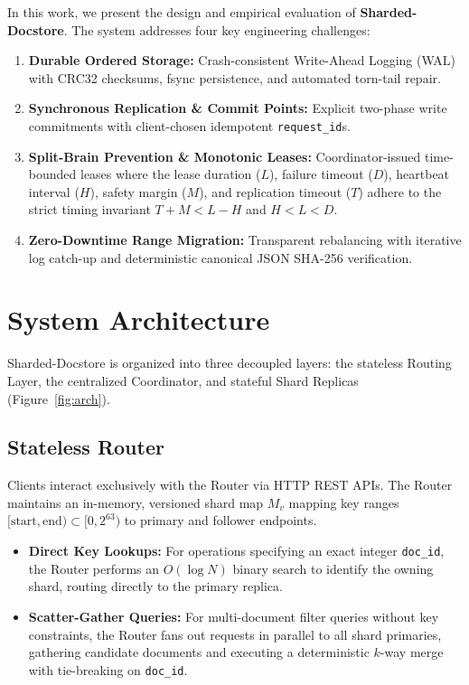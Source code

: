 \documentclass[10pt,journal,compsoc]{IEEEtran}
\begin{document}
In this work, we present the design and empirical evaluation of \textbf{Sharded-Docstore}. The system addresses four key engineering challenges:
\begin{enumerate}
    \item \textbf{Durable Ordered Storage:} Crash-consistent Write-Ahead Logging (WAL) with CRC32 checksums, fsync persistence, and automated torn-tail repair.
    \item \textbf{Synchronous Replication \& Commit Points:} Explicit two-phase write commitments with client-chosen idempotent \texttt{request\_id}s.
    \item \textbf{Split-Brain Prevention \& Monotonic Leases:} Coordinator-issued time-bounded leases where the lease duration ($L$), failure timeout ($D$), heartbeat interval ($H$), safety margin ($M$), and replication timeout ($T$) adhere to the strict timing invariant $T + M < L - H$ and $H < L < D$.
    \item \textbf{Zero-Downtime Range Migration:} Transparent rebalancing with iterative log catch-up and deterministic canonical JSON SHA-256 verification.
\end{enumerate}

\section{System Architecture}

Sharded-Docstore is organized into three decoupled layers: the stateless Routing Layer, the centralized Coordinator, and stateful Shard Replicas (Figure~\ref{fig:arch}).

\subsection{Stateless Router}
Clients interact exclusively with the Router via HTTP REST APIs. The Router maintains an in-memory, versioned shard map $M_v$ mapping key ranges $[\text{start}, \text{end}) \subset [0, 2^{63})$ to primary and follower endpoints.
\begin{itemize}
    \item \textbf{Direct Key Lookups:} For operations specifying an exact integer \texttt{doc\_id}, the Router performs an $O(\log N)$ binary search to identify the owning shard, routing directly to the primary replica.
    \item \textbf{Scatter-Gather Queries:} For multi-document filter queries without key constraints, the Router fans out requests in parallel to all shard primaries, gathering candidate documents and executing a deterministic $k$-way merge with tie-breaking on \texttt{doc\_id}.
\end{itemize}
\end{document}
